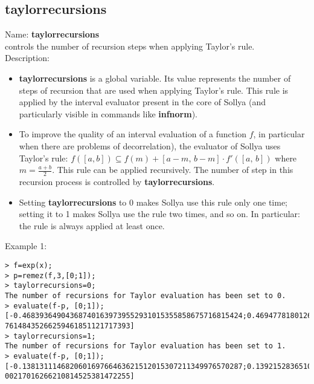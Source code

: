 \subsection{ taylorrecursions }
\noindent Name: \textbf{taylorrecursions}\\
controls the number of recursion steps when applying Taylor's rule.\\

\noindent Description: \begin{itemize}

\item \textbf{taylorrecursions} is a global variable. Its value represents the number of steps
   of recursion that are used when applying Taylor's rule. This rule is applied
   by the interval evaluator present in the core of Sollya (and particularly
   visible in commands like \textbf{infnorm}).

\item To improve the quality of an interval evaluation of a function $f$, in 
   particular when there are problems of decorrelation), the evaluator of Sollya
   uses Taylor's rule:  $f([a,b]) \subseteq f(m) + [a-m,\,b-m] \cdot f'([a,\,b])$ where $m=\frac{a+b}{2}$.
   This rule can be applied recursively.
   The number of step in this recursion process is controlled by \textbf{taylorrecursions}.

\item Setting \textbf{taylorrecursions} to 0 makes Sollya use this rule only one time;
   setting it to 1 makes Sollya use the rule two times, and so on.
   In particular: the rule is always applied at least once.
\end{itemize}
\noindent Example 1: 
\begin{center}\begin{minipage}{15cm}\begin{Verbatim}[frame=single]
> f=exp(x);
> p=remez(f,3,[0;1]);
> taylorrecursions=0;
The number of recursions for Taylor evaluation has been set to 0.
> evaluate(f-p, [0;1]);
[-0.468393649043687401639739552931015355858675716815424;0.4694778180126977487653
76148435266259461851121717393]
> taylorrecursions=1;
The number of recursions for Taylor evaluation has been set to 1.
> evaluate(f-p, [0;1]);
[-0.138131114682060169766463621512015307211349976570287;0.1392152836510705168921
00217016266210814525381472255]
\end{Verbatim}
\end{minipage}\end{center}
